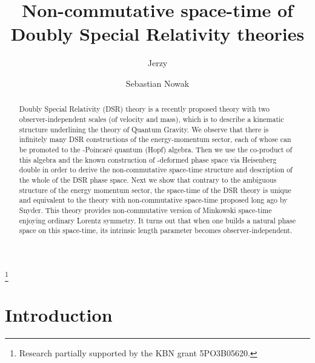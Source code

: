 \documentclass [prd,twocolumn,nofootinbib,showpacs]  {revtex4}
\begin{document}
\title{%
Non-commutative space-time of Doubly Special Relativity theories }
\author{ Jerzy }
\thanks{Research  partially supported
by the    KBN grant 5PO3B05620.}
\author{Sebastian Nowak}


\begin{abstract}
Doubly Special Relativity (DSR) theory is a recently proposed
theory with two observer-independent scales (of velocity and
mass), which is to  describe a kinematic structure underlining the
theory of Quantum  Gravity.  We  observe that there is infinitely
many  DSR constructions of the energy-momentum sector, each of
whose can be promoted to the \myHighlight{$\kappa$}\coordHE{}-Poincar\'e quantum (Hopf)
algebra. Then we use the co-product of this algebra and the known
construction of \myHighlight{$\kappa$}\coordHE{}-deformed phase space via Heisenberg
double  in order to derive the non-commutative space-time
structure and description of the whole of the DSR phase space.
Next we show that contrary to the ambiguous structure of the
energy momentum sector, the space-time of the DSR theory is unique
and equivalent to the theory with non-commutative space-time
proposed long ago by Snyder. This theory provides non-commutative
version of Minkowski space-time enjoying ordinary Lorentz
symmetry.  It turns out that when one builds a natural phase space
on this space-time, its intrinsic length parameter \myHighlight{$\ell$}\coordHE{} becomes
observer-independent.



\end{abstract}
\maketitle
\section{Introduction}
\end{document}
